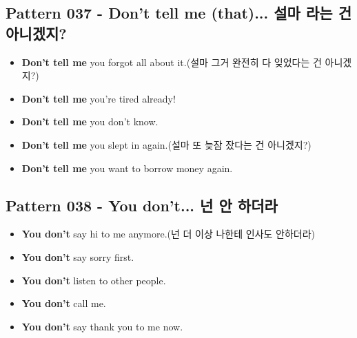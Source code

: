 \documentclass[11pt]{oblivoir}
\begin{document}
\subsection{Pattern 037 - Don't tell me (that)... 설마 \texttildelow 라는 건 아니겠지?}
\begin{itemize}
  \item \textbf{Don't tell me} you forgot all about it.(설마 그거 완전히 다 잊었다는 건 아니겠지?)
  \item \textbf{Don't tell me} you're tired already!
  \item \textbf{Don't tell me} you don't know.
  \item \textbf{Don't tell me} you slept in again.(설마 또 늦잠 잤다는 건 아니겠지?)
  \item \textbf{Don't tell me} you want to borrow money again.
\end{itemize}

\subsection{Pattern 038 - You don't... 넌 \texttildelow 안 하더라}
\begin{itemize}
  \item \textbf{You don't} say hi to me anymore.(넌 더 이상 나한테 인사도 안하더라)
  \item \textbf{You don't} say sorry first.
  \item \textbf{You don't} listen to other people.
  \item \textbf{You don't} call me.
  \item \textbf{You don't} say thank you to me now.
\end{itemize}
\end{document}
